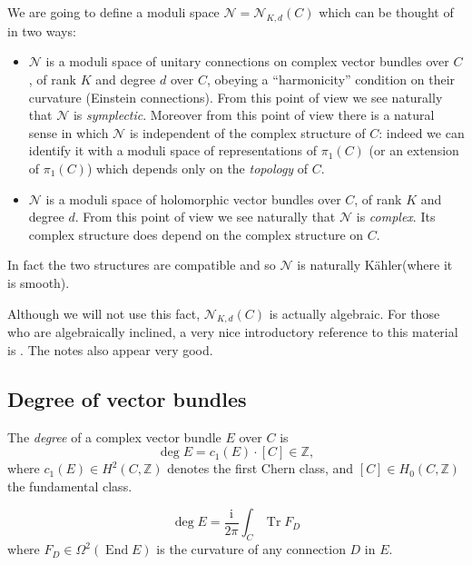 \documentclass[12pt,letterpaper,reqno]{article}
\numberwithin{equation}{section}
\newcommand{\cN}{\ensuremath{\mathcal N}}
\newcommand{\Z}{\ensuremath{\mathbb Z}}
\newcommand{\kahler}{K\"ahler\xspace}
\newcommand{\I}{{\mathrm i}}
\newcommand{\ti}[1]{\textit{#1}}
\DeclareMathOperator{\Tr}{Tr}
\DeclareMathOperator{\End}{End}
\begin{document}
We are going to define a moduli space $\cN = \cN_{K,d}(C)$ which can be 
thought of in two ways:
\begin{itemize}
\item $\cN$ is a moduli space of unitary connections on 
complex vector bundles over $C$, of
rank $K$ and degree $d$ over $C$, obeying a ``harmonicity''
condition on their curvature (Einstein connections).
From this point of view we see naturally that $\cN$ is
\ti{symplectic}. Moreover from this point of view
there is a natural sense in which $\cN$ is independent 
of the complex structure of $C$: indeed we can identify
it with a moduli space of representations of $\pi_1(C)$
(or an extension of $\pi_1(C)$) which depends only 
on the \ti{topology} of $C$.
\item $\cN$ is a moduli space of holomorphic vector 
bundles over $C$, of rank $K$ and degree $d$.
From this point of view we see naturally that $\cN$ is
\ti{complex}. Its complex structure does depend on
the complex structure on $C$.
\end{itemize}
In fact the two structures are compatible and so 
$\cN$ is naturally \kahler (where it is smooth).

Although we will not use this fact, $\cN_{K,d}(C)$ is actually
algebraic. For those who are algebraically inclined, a 
very nice introductory reference to this 
material is \cite{MR98b:14010}. The notes 
\cite{MR2408226} also appear very good.


\subsection{Degree of vector bundles}

\begin{defn} The \ti{degree} of a 
complex vector bundle $E$ over $C$ is
\begin{equation}
  \deg E = c_1(E) \cdot [C] \in \Z,
\end{equation}
where $c_1(E) \in H^2(C,\Z)$ denotes the first Chern class,
and $[C] \in H_0(C,\Z)$ the fundamental class.
\end{defn}

\begin{prop} \label{prop:chern-weil-degree}
\begin{equation}
  \deg E = \frac{\I}{2 \pi} \int_C \Tr F_D
\end{equation}
where $F_D \in \Omega^2(\End E)$ is the curvature of any
connection $D$ in $E$.
\end{prop}
\end{document}
